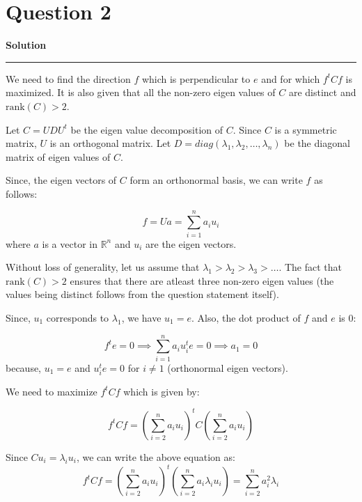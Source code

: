 \documentclass[a4paper,12pt]{article}
\title{\cooltitle{CS663 Assignment-4}}
\author{{\bf Saksham Rathi, Kavya Gupta, Shravan Srinivasa Raghavan} \\
\small Department of Computer Science, \\
Indian Institute of Technology Bombay \\}
\date{}
\newenvironment{solution}[2][]{%
    \begin{mdframed}[linecolor=blue!70!black, linewidth=2pt, roundcorner=10pt, backgroundcolor=yellow!10!white, skipabove=12pt, skipbelow=12pt]%
        \textbf{\large #2}
        \par\noindent\rule{\textwidth}{0.4pt}
}{
    \end{mdframed}
}
\begin{document}
\maketitle

\section*{Question 2}

\begin{solution}{Solution}
We need to find the direction $f$ which is perpendicular to $e$ and for which $f^{t}Cf$ is maximized. It is also given that all the non-zero eigen values of $C$ are distinct and $\text{rank}(C) > 2$. 

Let $C = UDU^t$ be the eigen value decomposition of $C$. Since $C$ is a symmetric matrix, $U$ is an orthogonal matrix. Let $D = diag(\lambda_1, \lambda_2, \ldots, \lambda_n)$ be the diagonal matrix of eigen values of $C$.


Since, the eigen vectors of $C$ form an orthonormal basis, we can write $f$ as follows:

\begin{equation}
    f = Ua = \sum_{i=1}^{n} a_{i}u_i
\end{equation}
where $a$ is a vector in $\mathbb{R}^n$ and $u_i$ are the eigen vectors.

Without loss of generality, let us assume that $\lambda_1 > \lambda_2 > \lambda_3 > \dots$. The fact that $\text{rank}(C) > 2$ ensures that there are atleast three non-zero eigen values (the values being distinct follows from the question statement itself).

Since, $u_1$ corresponds to $\lambda_1$, we have $u_1 = e$. Also, the dot product of $f$ and $e$ is 0:

\begin{equation}
  f^{t}e = 0 \implies \sum_{i=1}^{n} a_{i}u_{i}^{t}e = 0 \implies a_1 = 0
\end{equation}
because, $u_1 = e$ and $u_{i}^{t}e = 0$ for $i \neq 1$ (orthonormal eigen vectors).

We need to maximize $f^{t}Cf$ which is given by:

\begin{equation}
  f^{t}Cf = {\left(\sum_{i=2}^n a_{i}u_{i}\right)}^{t} C\left(\sum_{i=2}^n a_{i}u_{i}\right)
\end{equation}

Since $Cu_i = \lambda_i u_i$, we can write the above equation as:
\begin{equation}
  f^{t}Cf = {\left(\sum_{i=2}^n a_{i}u_{i}\right)}^t \left(\sum_{i=2}^n a_{i}\lambda_{i}u_{i}\right) = \sum_{i=2}^n a_{i}^{2}\lambda_{i}
\end{equation}


\end{solution}
\end{document}
